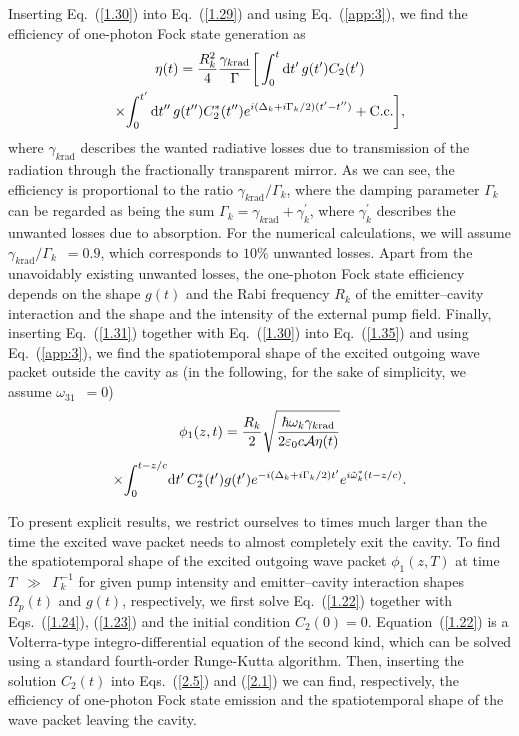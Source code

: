 \documentclass[pra, twocolumn]{revtex4}
\newcommand{\D}{\mbox{\rm d}}
\begin{document}
%
Inserting Eq.~(\ref{1.30}) into Eq.~(\ref{1.29})
and using Eq.~(\ref{app:3}),
we find the
efficiency of one-photon Fock state generation as
\begin{multline}
  \label{2.5}
%
  \eta(t) =
% 
  \frac{R_k^2}{4}\frac{\gamma_{k\mathrm{rad}}}{\Gamma}
  \bigg[
    \int_0^t \D t'\, g(t') C_2(t')
	\\ 	
	\times\!
    	\int_0^{t'} \D t''\, g(t'') C_2^*(t'')
        e^{i(\Delta_k + i \Gamma_k/2)(t'-t'')}
  	+
	\mbox{C.c.} 
	\bigg],
\end{multline}
where $\gamma_{k\mathrm{rad}}$ describes the wanted radiative
losses due to transmission of the radiation through the fractionally
transparent mirror.
As we can see,
the efficiency is proportional to the ratio
$\gamma_{k\mathrm{rad}}/\Gamma_k$, where the damping parameter
$\Gamma_k$ can be regarded as being the sum
$\Gamma_k = \gamma_{k\mathrm{rad}} + \gamma_{k}^\prime$, where $\gamma_{k}^\prime$
describes the unwanted losses due to absorption.
For the numerical calculations, we will assume
\mbox{$\gamma_{k\mathrm{rad}}/\Gamma_k$ $\!=0.9$}, which corresponds
to $10\%$ unwanted losses.
Apart from the unavoidably existing unwanted losses,
the one-photon Fock state efficiency depends on the
shape
$g(t)$ and the Rabi frequency $R_k$ of the emitter--cavity
interaction
and the
shape
and the intensity of the external pump field.
%
Finally, inserting
Eq.~(\ref{1.31}) together with Eq.~(\ref{1.30}) into Eq.~(\ref{1.35}) and
using
Eq.~(\ref{app:3}),
we
find the spatiotemporal shape of the excited outgoing wave packet
outside the cavity as
(in the following, for the sake of simplicity, we assume \mbox{$\omega_{31}$ $\!=0$})
\begin{multline}
  \label{2.1}
  \phi_1(z,t)=
  \frac{ R _k}{2}
 \sqrt{
  {\displaystyle
        \frac{\hbar\omega_k \gamma_{k\mathrm{rad}}}
        {2\varepsilon_0 c\mathcal{A} \eta(t)}
      }}
\\[.5ex] \times\!
     \int_0^{t-z/c}
     \!\D  t'\,
     C_2^*(t')g(t')
     e^{-i(\Delta_k + i \Gamma_k/2) t'}
     e^{i 
     \tilde{\omega}_k^*(t-z/c)
     }
 .
  \end{multline}


To present
%
explicit results, we restrict
ourselves to
%
times
%
much larger than the
time the excited wave packet needs to almost completely exit the
cavity.
%
To find the spatiotemporal shape of the excited outgoing wave
packet 
$\phi_1(z,T)$ at time \mbox{$T$ $\!\gg$ $\!\Gamma_k^{-1}$}
for
given pump intensity and emitter--cavity interaction shapes
$\Omega_p (t)$ and $g(t)$, respectively,
we first solve
Eq.~(\ref{1.22}) together with Eqs.~(\ref{1.24}), (\ref{1.23}) and
the initial condition \mbox{$C_2(0)=0$}. Equation~(\ref{1.22}) is a
Volterra-type integro-differential equation of the second kind, which
can be solved using a standard fourth-order Runge-Kutta algorithm.
%
Then, inserting the solution $C_2(t)$ into
Eqs.~(\ref{2.5}) and (\ref{2.1}) we can find, respectively, the
efficiency of one-photon Fock state emission and the spatiotemporal
shape of the wave packet leaving the cavity.
\end{document}
